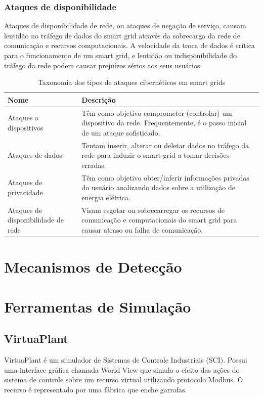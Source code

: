 \documentclass[cic,tc]{iiufrgs}
\begin{document}
\subsubsection{Ataques de disponibilidade}
Ataques de disponibilidade de rede, ou ataques de negação de serviço, causam lentidão no tráfego de dados do smart grid através da sobrecarga da rede de comunicação e recursos computacionais. A velocidade da troca de dados é crítica para o funcionamento de um smart grid, e lentidão ou indisponibilidade do tráfego da rede podem causar prejuízos sérios aos seus usuários.

\begin{table}[h]
   \caption{Taxonomia dos tipos de ataques cibernéticos em smart grids}
   \centering
       \begin{tabular}{p{4cm}|p{8cm}}
         \hline
         Nome  &  Descrição\\
         \hline
         \hline
         Ataques a dispositivos & Têm como objetivo comprometer (controlar) um dispositivo da rede. Frequentemente, é o passo inicial de um ataque sofisticado.\\
         \hline
		Ataques de dados & Tentam inserir, alterar ou deletar dados no tráfego da rede para induzir o smart grid a tomar decisões erradas.\\
 \hline
		Ataques de privacidade & Têm como objetivo obter/inferir informações privadas do usuário analizando dados sobre a utilização de energia elétrica.\\
 \hline
		Ataques de disponibilidade de rede & Visam esgotar ou sobrecarregar os recursos de comunicação e computacionais do smart grid para causar atraso ou falha de comunicação. \\
         \hline
       \end{tabular}
\label{tbl:attacktypes}
\end{table}

\section{Mecanismos de Detecção}
\section{Ferramentas de Simulação}

\subsection{VirtuaPlant}
VirtuaPlant \cite{virtuaplantwebsite} é um simulador de Sistemas de Controle Industriais (SCI). Possui uma interface gráfica chamada World View que simula o efeito das ações do sistema de controle sobre um recurso virtual utilizando protocolo Modbus. O recurso é representado por uma fábrica que enche garrafas.
	
\end{document}
